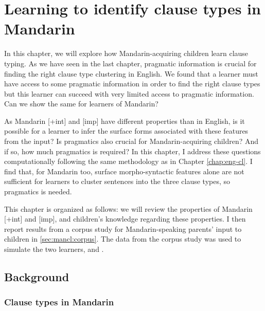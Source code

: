 \chapter{Learning to identify clause types in Mandarin}
\label{chap:man-cl}

In this chapter, we will explore how Mandarin-acquiring children learn clause typing. As we have seen in the last chapter, pragmatic information is crucial for finding the right clause type clustering in English. We found that a learner must have access to some pragmatic information in order to find the right clause types but this learner can succeed with very limited access to pragmatic information. Can we show the same for learners of Mandarin?

As Mandarin [+int] and [imp] have different properties than in English, is it possible for a learner to infer the surface forms associated with these features from the input? Is pragmatics also crucial for Mandarin-acquiring children? And if so, how much pragmatics is required? In this chapter, I address these questions computationally following the same methodology as in Chapter \ref{chap:eng-cl}. I find that, for Mandarin too, surface morpho-syntactic features alone are not sufficient for learners to cluster sentences into the three clause types, so pragmatics is needed. 

This chapter is organized as follows: we will review the properties of Mandarin [+int] and [imp], and children's knowledge regarding these properties. I then report results from a corpus study for Mandarin-speaking parents' input to children in  \ref{sec:mancl:corpus}. The data from the corpus study was used to simulate the two learners, \distlearner{} and \praglearner{}.  %

\section{Background}
\label{sec:mancl:bg}
\subsection{Clause types in Mandarin}
\label{sec:mancl:bg:theory}


